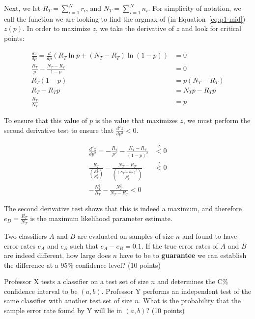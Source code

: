 \documentclass[fleqn]{homework}
\begin{document}
\begin{problem}{1}
    Next, we let $R_T = \sum_{i=1}^{N} r_i$, and $N_T = \sum_{i=1}^N n_i$.  For
    simplicity of notation, we call the function we are looking to find the
    argmax of (in Equation~\ref{eq:p1-mid}) $z(p)$.  In order to maximize $z$,
    we take the derivative of $z$ and look for critical points:

    \begin{align}
      \frac{dz}{dp} = \frac{d}{dp} \left( R_T \ln p + (N_T-R_T)\ln(1-p) \right)
      &= 0 \\
      \frac{R_T}{p} - \frac{N_T-R_T}{1-p} &= 0 \\
      R_T(1-p) &= p(N_T - R_T) \\
      R_T - R_T p &= N_T p - R_T p \\
      \frac{R_T}{N_T} &= p
    \end{align}

    To ensure that this value of $p$ is the value that maximizes $z$, we must
    perform the second derivative test to ensure that $\frac{d^2z}{dp^2} < 0$.

    \begin{align}
      \frac{d^2z}{dp^2} = -\frac{R_T}{p^2} - \frac{N_T - R_T}{(1-p)^2}
      &\overset{?}{<} 0 \\
      \frac{R_T}{\left(\frac{R_T^2}{N_T^2}\right)} - \frac{N_T -
      R_T}{\left(\frac{(N_T-R_T)^2}{N_T^2}\right)} &\overset{?}{<} 0 \\
      -\frac{N_T^2}{R_T} - \frac{N_T^2}{N_T-R_T} < 0
    \end{align}

    The second derivative test shows that this is indeed a maximum, and
    therefore $e_D = \frac{R_T}{N_T}$ is the maximum likelihood parameter
    estimate.
  \end{problem}

  \begin{problem}{2}
    \begin{question}
      Two classifiers $A$ and $B$ are evaluated on samples of size $n$ and found
      to have error rates $e_A$ and $e_B$ such that $e_A - e_B = 0.1$.  If the
      true error rates of $A$ and $B$ are indeed different, how large does $n$
      have to be to \textbf{guarantee} we can establish the difference at a 95\%
      confidence level? (10 points)
    \end{question}
  \end{problem}

  \begin{problem}{3}
    \begin{question}
      Professor X tests a classifier on a test set of size $n$ and determines
      the C\% confidence interval to be $(a,b)$.  Professor Y performs an
      independent test of the same classifier with another test set of size
      $n$.  What is the probability that the sample error rate found by Y will
      lie in $(a,b)$? (10 points)
    \end{question}
  \end{problem}
\end{document}
